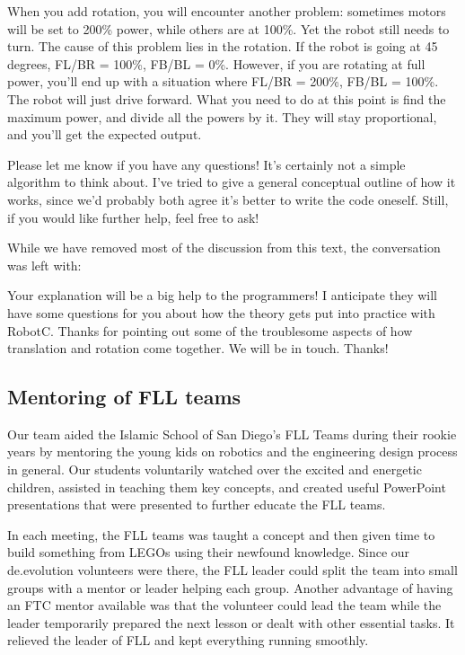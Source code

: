 \begin{fancyquotes}
When you add rotation, you will encounter another problem: sometimes motors will be set to 200\% power, while others are at 100\%. Yet the robot still needs to turn. The cause of this problem lies in the rotation. If the robot is going at 45 degrees, FL/BR = 100\%, FB/BL = 0\%. However, if you are rotating at full power, you'll end up with a situation where FL/BR = 200\%, FB/BL = 100\%. The robot will just drive forward. What you need to do at this point is find the maximum power, and divide all the powers by it. They will stay proportional, and you'll get the expected output.\newline\newline

Please let me know if you have any questions! It's certainly not a simple algorithm to think about. I've tried to give a general conceptual outline of how it works, since we'd probably both agree it's better to write the code oneself. Still, if you would like further help, feel free to ask!
\end{fancyquotes}\newline

While we have removed most of the discussion from this text, the conversation was left with:

\begin{fancyquotes}
Your explanation will be a big help to the programmers! I anticipate they will have some questions for you about how the theory gets put into practice with RobotC. Thanks for pointing out some of the troublesome aspects of how translation and rotation come together. We will be in touch. Thanks! 
\end{fancyquotes}

\subsection{Mentoring of FLL teams}
Our team aided the Islamic School of San Diego's FLL Teams during their rookie years by mentoring the young kids on robotics and the engineering design process in general. Our students voluntarily watched over the excited and energetic children, assisted in teaching them key concepts, and created useful PowerPoint presentations that were presented to further educate the FLL teams.

In each meeting, the FLL teams was taught a concept and then given time to build something from LEGOs using their newfound knowledge. Since our de.evolution volunteers were there, the FLL leader could split the team into small groups with a mentor or leader helping each group. Another advantage of having an FTC mentor available was that the volunteer could lead the team while the leader temporarily prepared the next lesson or dealt with other essential tasks. It relieved the leader of FLL and kept everything running smoothly.

